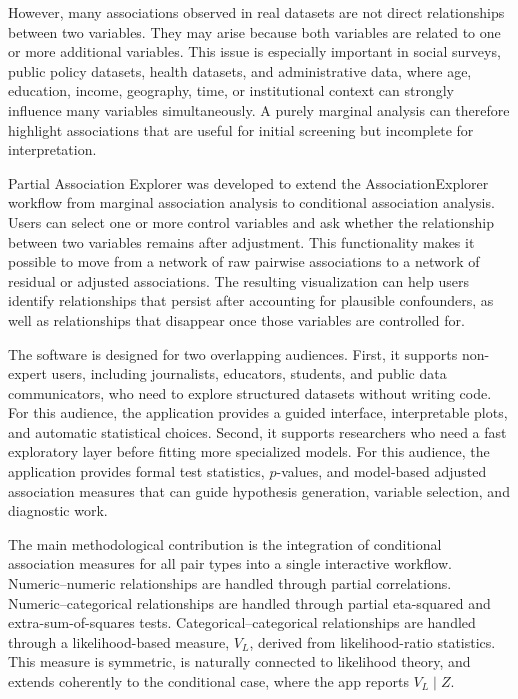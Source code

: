 \documentclass[11pt,a4paper]{article}
\begin{document}
However, many associations observed in real datasets are not direct relationships between two variables. They may arise because both variables are related to one or more additional variables. This issue is especially important in social surveys, public policy datasets, health datasets, and administrative data, where age, education, income, geography, time, or institutional context can strongly influence many variables simultaneously. A purely marginal analysis can therefore highlight associations that are useful for initial screening but incomplete for interpretation.

Partial Association Explorer was developed to extend the AssociationExplorer workflow from marginal association analysis to conditional association analysis. Users can select one or more control variables and ask whether the relationship between two variables remains after adjustment. This functionality makes it possible to move from a network of raw pairwise associations to a network of residual or adjusted associations. The resulting visualization can help users identify relationships that persist after accounting for plausible confounders, as well as relationships that disappear once those variables are controlled for.

The software is designed for two overlapping audiences. First, it supports non-expert users, including journalists, educators, students, and public data communicators, who need to explore structured datasets without writing code. For this audience, the application provides a guided interface, interpretable plots, and automatic statistical choices. Second, it supports researchers who need a fast exploratory layer before fitting more specialized models. For this audience, the application provides formal test statistics, $p$-values, and model-based adjusted association measures that can guide hypothesis generation, variable selection, and diagnostic work.

The main methodological contribution is the integration of conditional association measures for all pair types into a single interactive workflow. Numeric--numeric relationships are handled through partial correlations. Numeric--categorical relationships are handled through partial eta-squared and extra-sum-of-squares tests. Categorical--categorical relationships are handled through a likelihood-based measure, $V_L$, derived from likelihood-ratio statistics. This measure is symmetric, is naturally connected to likelihood theory, and extends coherently to the conditional case, where the app reports $V_L \mid Z$.
\end{document}
